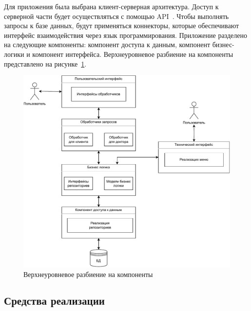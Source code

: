 Для приложения была выбрана клиент-серверная архитектура. Доступ к серверной части будет осуществляться с помощью API~\cite{api}. Чтобы выполнять запросы к базе данных, будут применяться коннекторы, которые обеспечивают интерфейс взаимодействия через язык программирования. Приложение разделено на следующие компоненты: компонент доступа к данным, компонент бизнес-логики и компонент интерфейса. Верхнеуровневое разбиение на компоненты представлено на рисунке~\ref{img:upper}.
\begin{figure}[!h]
	\centering
	\includegraphics[width=\textwidth]{image/upper}
	\caption{Верхнеуровневое разбиение на компоненты}
	\label{img:upper}
\end{figure}

\newpage

\subsection{Средства реализации}


